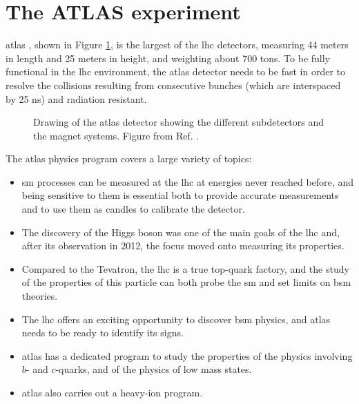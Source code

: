 
\section{The ATLAS experiment}
\label{sed:cern:atlas}

\gls{atlas} \cite{atlas:atlas}, shown in Figure \ref{fig:atlas:atlas}, is the largest of the \gls{lhc} detectors, 
measuring 44 meters in length and 25 meters in height, and weighting about 700 tons. 
To be fully functional in the \gls{lhc} environment,  the \gls{atlas} detector needs to be fast in order to resolve the collisions resulting from consecutive bunches (which are interspaced by 25 ns) and radiation resistant. 

\begin{figure}[ht]
\centering
{}
\caption{Drawing of the \gls{atlas} detector showing the different subdetectors and
the magnet systems. Figure from Ref. \cite{atlas:atlas}.}
\label{fig:atlas:atlas}
\end{figure}

The \gls{atlas} physics program covers a large variety of topics: 
\begin{itemize}
\item \gls{sm} processes can be measured at the \gls{lhc} at energies never reached before, and being sensitive to them is essential both to provide accurate measurements and to use them as candles to calibrate the detector. 
\item The discovery of the Higgs boson was one of the main goals of the \gls{lhc} and, after its observation in 2012, the focus moved onto measuring its properties. 
\item Compared to the Tevatron, the \gls{lhc} is a true top-quark factory, 
and the study of the properties of this particle can both probe the \gls{sm} and set limits on \gls{bsm} theories.
\item The \gls{lhc} offers an exciting opportunity to discover \gls{bsm} physics, and \gls{atlas} needs to be ready to identify its signs. 
\item \gls{atlas} has a dedicated program to study the properties of the physics involving $b$- and $c$-quarks, and of the physics of low mass states.  
\item \gls{atlas} also carries out a heavy-ion program.
\end{itemize}

